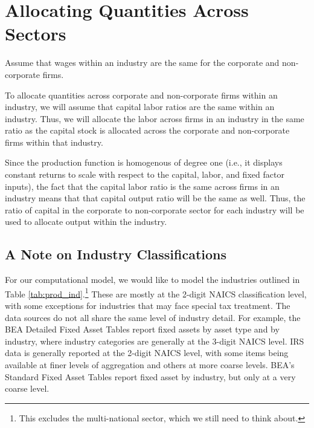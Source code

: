 \documentclass[article,11pt,letterpaper,fleqn]{article}
\theoremstyle{definition}
\numberwithin{equation}{section}
\begin{document}
\section{Allocating Quantities Across Sectors}

Assume that wages within an industry are the same for the corporate and non-corporate firms.

To allocate quantities across corporate and non-corporate firms within an industry, we will assume that capital labor ratios are the same within an industry.  Thus, we will allocate the labor across firms in an industry in the same ratio as the capital stock is allocated across the corporate and non-corporate firms within that industry.  

Since the production function is homogenous of degree one (i.e., it displays constant returns to scale with respect to the capital, labor, and fixed factor inputs), the fact that the capital labor ratio is the same across firms in an industry means that that capital output ratio will be the same as well.  Thus, the ratio of capital in the corporate to non-corporate sector for each industry will be used to allocate output within the industry.

\subsection{A Note on Industry Classifications}

For our computational model, we would like to model the industries outlined in Table \ref{tab:prod_ind}.\footnote{This excludes the multi-national sector, which we still need to think about.}  These are mostly at the 2-digit NAICS classification level, with some exceptions for industries that may face special tax treatment.  The data sources do not all share the same level of industry detail.  For example, the BEA Detailed Fixed Asset Tables report fixed assets by asset type and by industry, where industry categories are generally at the 3-digit NAICS level.  IRS data is generally reported at the 2-digit NAICS level, with some items being available at finer levels of aggregation and others at more coarse levels.  BEA's Standard Fixed Asset Tables report fixed asset by industry, but only at a very coarse level.  
\end{document}
